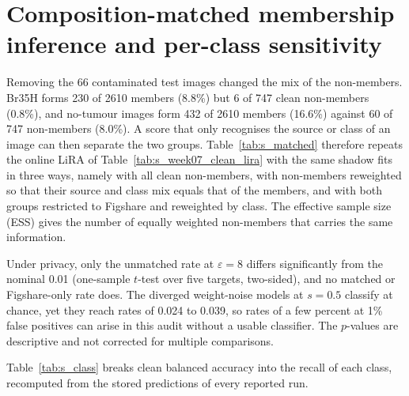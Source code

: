 \documentclass[a4paper,11pt]{article}
\begin{document}


\section{Composition-matched membership inference and per-class sensitivity}
Removing the 66 contaminated test images changed the mix of the non-members. Br35H forms 230 of 2610 members (8.8\%)
but 6 of 747 clean non-members (0.8\%), and no-tumour images form 432 of 2610 members (16.6\%) against 60 of 747
non-members (8.0\%). A score that only recognises the source or class of an image can then separate the two groups.
Table~\ref{tab:s_matched} therefore repeats the online LiRA of Table~\ref{tab:s_week07_clean_lira} with the same
shadow fits in three ways, namely with all clean non-members, with non-members reweighted so that their source and
class mix equals that of the members, and with both groups restricted to Figshare and reweighted by class. The
effective sample size (ESS) gives the number of equally weighted non-members that carries the same information.



Under privacy, only the unmatched rate at $\varepsilon=8$ differs significantly from the nominal 0.01 (one-sample
$t$-test over five targets, two-sided), and no matched or Figshare-only rate does. The diverged weight-noise models at
$s=0.5$ classify at chance, yet they reach rates of 0.024 to 0.039, so rates of a few percent at 1\% false positives
can arise in this audit without a usable classifier. The $p$-values are descriptive and not corrected for multiple
comparisons.

Table~\ref{tab:s_class} breaks clean balanced accuracy into the recall of each class, recomputed from the stored
predictions of every reported run.


\end{document}
